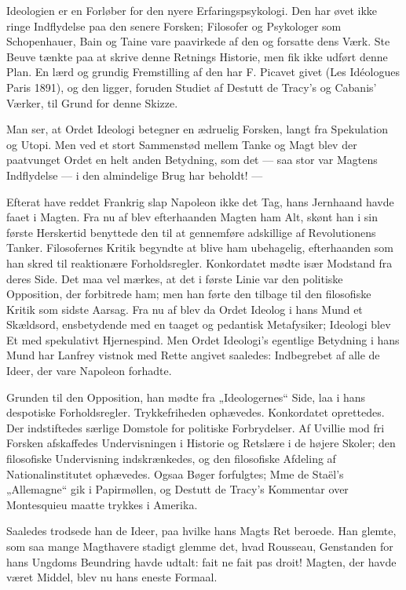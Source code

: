 \documentclass[12pt,a4paper,openany]{book}
\newcommand{\opage}[1]{\marginnote{\footnotesize\textit{[#1]}}}
\begin{document}
Ideologien er en Forløber for den nyere Erfaringspsykologi.
Den har øvet ikke ringe Indflydelse paa den senere Forsken;
Filosofer og Psykologer som Schopenhauer, Bain og Taine vare
paavirkede af den og forsatte dens Værk. Ste Beuve tænkte
paa at skrive denne Retnings Historie, men fik ikke udført
denne Plan. En lærd og grundig Fremstilling af den har
F. Picavet givet (Les Idéologues Paris 1891), og den ligger,
foruden Studiet af Destutt de Tracy’s og Cabanis’ Værker, til
Grund for denne Skizze.

Man ser, at Ordet Ideologi betegner en ædruelig Forsken,
langt fra Spekulation og Utopi. Men ved et stort Sammenstød
mellem Tanke og Magt blev der paatvunget Ordet en helt
anden Betydning, som det --- saa stor var Magtens Indflydelse
--- i den almindelige Brug har beholdt! ---

Efterat have reddet Frankrig slap Napoleon ikke det Tag,
hans Jernhaand havde faaet i Magten. Fra nu af blev efterhaanden
Magten ham Alt, skønt han i sin første Herskertid
benyttede den til at gennemføre adskillige af Revolutionens
Tanker. Filosofernes Kritik begyndte at blive ham ubehagelig,
efterhaanden som han skred til reaktionære Forholdsregler.
Konkordatet mødte især Modstand fra deres Side. Det maa vel
mærkes, at det i første Linie var den politiske Opposition, der
forbitrede ham; men han førte den tilbage til den filosofiske
Kritik som sidste Aarsag. Fra nu af blev da Ordet Ideolog i
hans Mund et Skældsord, ensbetydende med en taaget og pedantisk
Metafysiker; Ideologi blev Et med spekulativt Hjernespind. Men
Ordet Ideologi’s egentlige Betydning i hans Mund har Lanfrey
vistnok med Rette angivet saaledes: Indbegrebet af alle de
Ideer, der vare Napoleon forhadte.

Grunden til den Opposition, han mødte fra „Ideologernes“
Side, laa i hans despotiske Forholdsregler. Trykkefriheden ophævedes.
Konkordatet oprettedes. Der indstiftedes særlige Domstole
for politiske Forbrydelser. Af Uvillie mod fri Forsken
afskaffedes Undervisningen i Historie og Retslære i de højere
Skoler; den filosofiske Undervisning indskrænkedes, og den
\setcounter{footnote}{0}%
\opage{187}filosofiske Afdeling af Nationalinstitutet ophævedes. Ogsaa
Bøger forfulgtes; Mme de Staël’s „Allemagne“ gik i Papirmøllen,
og Destutt de Tracy’s Kommentar over Montesquieu
maatte trykkes i Amerika.

Saaledes trodsede han de Ideer, paa hvilke hans Magts
Ret beroede. Han glemte, som saa mange Magthavere stadigt
glemme det, hvad Rousseau, Genstanden for hans Ungdoms
Beundring havde udtalt: fait ne fait pas droit! Magten, der
havde været Middel, blev nu hans eneste Formaal.
\end{document}
